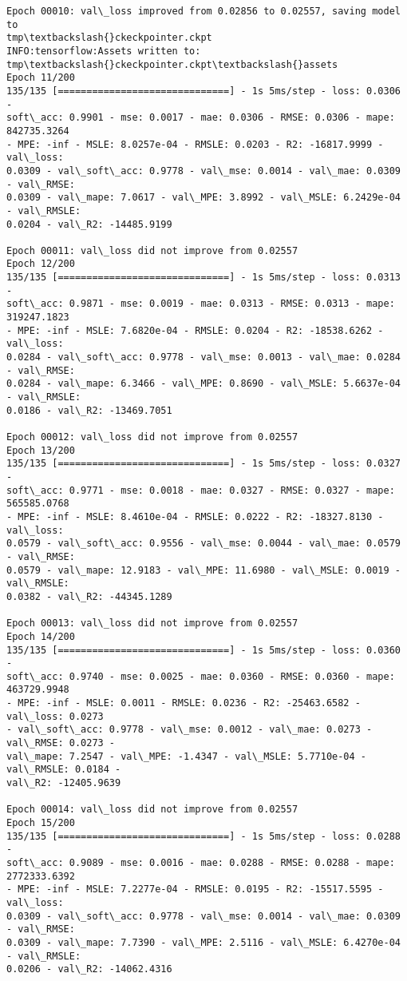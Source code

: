 \documentclass[11pt]{article}
\begin{document}
\begin{Verbatim}[commandchars=\\\{\}]
Epoch 00010: val\_loss improved from 0.02856 to 0.02557, saving model to
tmp\textbackslash{}ckeckpointer.ckpt
INFO:tensorflow:Assets written to: tmp\textbackslash{}ckeckpointer.ckpt\textbackslash{}assets
Epoch 11/200
135/135 [==============================] - 1s 5ms/step - loss: 0.0306 -
soft\_acc: 0.9901 - mse: 0.0017 - mae: 0.0306 - RMSE: 0.0306 - mape: 842735.3264
- MPE: -inf - MSLE: 8.0257e-04 - RMSLE: 0.0203 - R2: -16817.9999 - val\_loss:
0.0309 - val\_soft\_acc: 0.9778 - val\_mse: 0.0014 - val\_mae: 0.0309 - val\_RMSE:
0.0309 - val\_mape: 7.0617 - val\_MPE: 3.8992 - val\_MSLE: 6.2429e-04 - val\_RMSLE:
0.0204 - val\_R2: -14485.9199

Epoch 00011: val\_loss did not improve from 0.02557
Epoch 12/200
135/135 [==============================] - 1s 5ms/step - loss: 0.0313 -
soft\_acc: 0.9871 - mse: 0.0019 - mae: 0.0313 - RMSE: 0.0313 - mape: 319247.1823
- MPE: -inf - MSLE: 7.6820e-04 - RMSLE: 0.0204 - R2: -18538.6262 - val\_loss:
0.0284 - val\_soft\_acc: 0.9778 - val\_mse: 0.0013 - val\_mae: 0.0284 - val\_RMSE:
0.0284 - val\_mape: 6.3466 - val\_MPE: 0.8690 - val\_MSLE: 5.6637e-04 - val\_RMSLE:
0.0186 - val\_R2: -13469.7051

Epoch 00012: val\_loss did not improve from 0.02557
Epoch 13/200
135/135 [==============================] - 1s 5ms/step - loss: 0.0327 -
soft\_acc: 0.9771 - mse: 0.0018 - mae: 0.0327 - RMSE: 0.0327 - mape: 565585.0768
- MPE: -inf - MSLE: 8.4610e-04 - RMSLE: 0.0222 - R2: -18327.8130 - val\_loss:
0.0579 - val\_soft\_acc: 0.9556 - val\_mse: 0.0044 - val\_mae: 0.0579 - val\_RMSE:
0.0579 - val\_mape: 12.9183 - val\_MPE: 11.6980 - val\_MSLE: 0.0019 - val\_RMSLE:
0.0382 - val\_R2: -44345.1289

Epoch 00013: val\_loss did not improve from 0.02557
Epoch 14/200
135/135 [==============================] - 1s 5ms/step - loss: 0.0360 -
soft\_acc: 0.9740 - mse: 0.0025 - mae: 0.0360 - RMSE: 0.0360 - mape: 463729.9948
- MPE: -inf - MSLE: 0.0011 - RMSLE: 0.0236 - R2: -25463.6582 - val\_loss: 0.0273
- val\_soft\_acc: 0.9778 - val\_mse: 0.0012 - val\_mae: 0.0273 - val\_RMSE: 0.0273 -
val\_mape: 7.2547 - val\_MPE: -1.4347 - val\_MSLE: 5.7710e-04 - val\_RMSLE: 0.0184 -
val\_R2: -12405.9639

Epoch 00014: val\_loss did not improve from 0.02557
Epoch 15/200
135/135 [==============================] - 1s 5ms/step - loss: 0.0288 -
soft\_acc: 0.9089 - mse: 0.0016 - mae: 0.0288 - RMSE: 0.0288 - mape: 2772333.6392
- MPE: -inf - MSLE: 7.2277e-04 - RMSLE: 0.0195 - R2: -15517.5595 - val\_loss:
0.0309 - val\_soft\_acc: 0.9778 - val\_mse: 0.0014 - val\_mae: 0.0309 - val\_RMSE:
0.0309 - val\_mape: 7.7390 - val\_MPE: 2.5116 - val\_MSLE: 6.4270e-04 - val\_RMSLE:
0.0206 - val\_R2: -14062.4316


\end{Verbatim}
\end{document}
